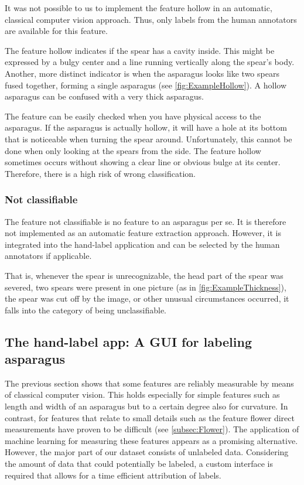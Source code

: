 It was not possible to us to implement the feature hollow in an automatic, classical computer vision approach. Thus, only labels from the human annotators are available for this feature.

\bigskip
The feature hollow indicates if the spear has a cavity inside.
This might be expressed by a bulgy center and a line running vertically along the spear’s body. Another, more distinct indicator is when the asparagus looks like two spears fused together, forming a single asparagus (see \autoref{fig:ExampleHollow}). A hollow asparagus can be confused with a very thick asparagus.

The feature can be easily checked when you have physical access to the asparagus. If the asparagus is actually hollow, it will have a hole at its bottom that is noticeable when turning the spear around. Unfortunately, this cannot be done when only looking at the spears from the side. The feature hollow sometimes occurs without showing a clear line or obvious bulge at its center. Therefore, there is a high risk of wrong classification.


\subsubsection{Not classifiable}
\label{subsec:NotClassifiable}

The feature not classifiable is no feature to an asparagus per se. It is therefore not implemented as an automatic feature extraction approach. However, it is integrated into the hand-label application and can be selected by the human annotators if applicable.

That is, whenever the spear is unrecognizable, the head part of the spear was severed, two spears were present in one picture (as in \autoref{fig:ExampleThickness}), the spear was cut off by the image, or other unusual circumstances occurred, it falls into the category of being unclassifiable.


\subsection{The hand-label app: A GUI for labeling asparagus}
\label{sec:LabelApp}

The previous section shows that some features are reliably measurable by means of classical computer vision. This holds especially for simple features such as length and width of an asparagus but to a certain degree also for curvature. In contrast, for features that relate to small details such as the feature flower direct measurements have proven to be difficult (see \autoref{subsec:Flower}). The application of machine learning for measuring these features appears as a promising alternative. 
However, the major part of our dataset consists of unlabeled data. Considering the amount of data that could potentially be labeled, a custom interface is required that allows for a time efficient attribution of labels.


